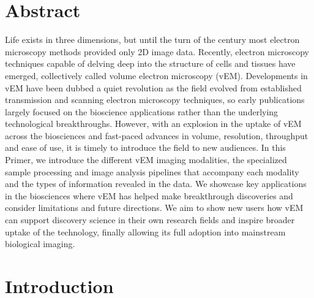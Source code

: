 \documentclass{article}
\begin{document}
\section*{Abstract}

Life exists in three dimensions, but until the turn of the century most electron microscopy methods provided only 2D image data. Recently, electron microscopy techniques capable of delving deep into the structure of cells and tissues have emerged, collectively called volume electron microscopy (vEM). Developments in vEM have been dubbed a quiet revolution as the field evolved from established transmission and scanning electron microscopy techniques, so early publications largely focused on the bioscience applications rather than the underlying technological breakthroughs. However, with an explosion in the uptake of vEM across the biosciences and fast-paced advances in volume, resolution, throughput and ease of use, it is timely to introduce the field to new audiences. In this Primer, we introduce the different vEM imaging modalities, the specialized sample processing and image analysis pipelines that accompany each modality and the types of information revealed in the data. We showcase key applications in the biosciences where vEM has helped make breakthrough discoveries and consider limitations and future directions. We aim to show new users how vEM can support discovery science in their own research fields and inspire broader uptake of the technology, finally allowing its full adoption into mainstream biological imaging.

\section*{Introduction}
\end{document}

